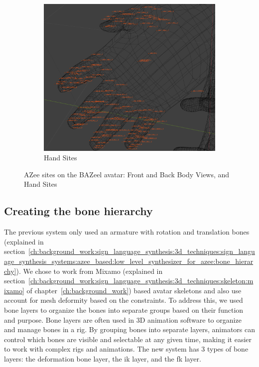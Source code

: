 \documentclass[../../main.tex]{subfiles}
\begin{document}
\begin{figure}[h]
\begin{subfigure}[b]{0.3\textwidth}
        \includegraphics[width=\textwidth]{chapters/avatar_creation_pose_synthesis/images/sites_hand.png}
        \caption{Hand Sites}
        \label{fig:sites_hand}
    \end{subfigure}
    \caption{AZee sites on the BAZeel avatar: Front and Back Body Views, and Hand Sites}
    \label{fig:sites_bazeel_combined}
\end{figure}

\subsection{Creating the bone hierarchy}
\label{ch:avatar_creation_pose_synthesis:proc_rig_signing_avatars:bone_layers}

The previous system only used an armature with rotation and translation bones (explained in section~\ref{ch:background_work:sign_language_synthesis:3d_techniques:sign_language_synthesis_systems:azee_based:low_level_synthesizer_for_azee:bone_hierarchy}). We chose to work from Mixamo (explained in section~\ref{ch:background_work:sign_language_synthesis:3d_techniques:skeleton:mixamo} of chapter~\ref{ch:background_work}) based avatar skeletons and also use account for mesh deformity based on the constraints. To address this, we used bone layers to organize the bones into separate groups based on their function and purpose. Bone layers are often used in 3D animation software to organize and manage bones in a rig. By grouping bones into separate layers, animators can control which bones are visible and selectable at any given time, making it easier to work with complex rigs and animations. The new system has 3 types of bone layers: the deformation bone layer, the \gls{ik} layer, and the \gls{fk} layer.
\end{document}
